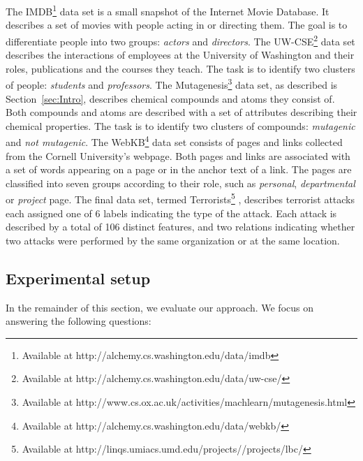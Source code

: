 The IMDB\footnote{Available at http://alchemy.cs.washington.edu/data/imdb} data set is a small snapshot of the Internet Movie Database.
It describes a set of movies with people acting in or directing them.
The goal is to differentiate people into two groups: \textit{actors} and \textit{directors}.
The UW-CSE\footnote{Available at http://alchemy.cs.washington.edu/data/uw-cse/} data set describes the interactions of employees at the University of Washington and their roles, publications and the courses they teach.
The task is to identify two clusters of people: \textit{students} and \textit{professors}.
The Mutagenesis\footnote{Available at http://www.cs.ox.ac.uk/activities/machlearn/mutagenesis.html} data set, as described is Section~\ref{sec:Intro}, describes chemical compounds and atoms they consist of.
Both compounds and atoms are described with a set of attributes describing their chemical properties.
The task is to identify two clusters of compounds: \textit{mutagenic} and \textit{not mutagenic}.
The WebKB\footnote{Available at http://alchemy.cs.washington.edu/data/webkb/} data set consists of pages and links collected from the Cornell University's webpage.
Both pages and links are associated with a set of words appearing on a page or in the anchor text of a link.
The pages are classified into seven groups according to their role, such as \textit{personal}, \textit{departmental} or \textit{project} page.
The final data set, termed Terrorists\footnote{Available at http://linqs.umiacs.umd.edu/projects//projects/lbc/} \cite{sen:aimag08}, describes terrorist attacks each assigned one of 6 labels indicating the type of the attack.
Each attack is described by a total of 106 distinct features, and two relations indicating whether two attacks were performed by the same organization or at the same location.



\subsection{Experimental setup}

In the remainder of this section, we evaluate our approach.
We focus on answering the following questions:

